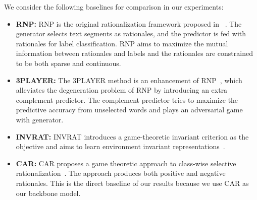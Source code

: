 \documentclass[letterpaper]{article} %
\begin{document}
We consider the following baselines for comparison in our experiments:
\begin{itemize}
    \item \textbf{RNP:} RNP is the original rationalization framework proposed in ~\cite{lei2016rationalizing}.
    The generator selects text segments as rationales, and the predictor is fed with rationales for label classification. 
    RNP aims to maximize the mutual information between
    rationales and labels and the rationales are constrained to be both sparse and continuous. 
    
    \item \textbf{3PLAYER:} The 3PLAYER method is an enhancement of RNP~\cite{yu2019rethinking}, which alleviates the degeneration problem of RNP by introducing an extra complement predictor. The complement predictor tries to maximize the predictive accuracy from unselected words and plays an adversarial game with generator. 
    
    \item \textbf{INVRAT:} INVRAT introduces a game-theoretic invariant criterion as the objective and aims to learn environment invariant representations~\cite{chang2020invariant}. 
    

    \item \textbf{CAR:} CAR proposes a game theoretic approach to class-wise selective rationalization~\cite{chang2019game}. The approach produces both positive and negative rationales. This is the direct baseline of our results because we use CAR as our backbone model.
    
\end{itemize}
\end{document}
